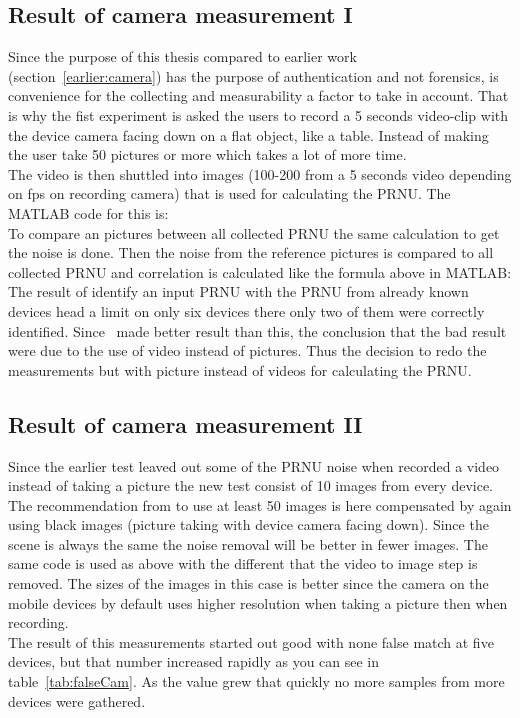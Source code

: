 \subsection{Result of camera measurement I}
Since the purpose of this thesis compared to earlier work (section~\ref{earlier:camera}) has the purpose of authentication and not forensics, is convenience for the collecting and measurability a factor to take in account. That is why the fist experiment is asked the users to record a 5 seconds video-clip with the device camera facing down on a flat object, like a table. Instead of making the user take 50 pictures or more which takes a lot of more time. \\
The video is then shuttled into images (100-200 from a 5 seconds video depending on fps on recording camera) that is used for calculating the PRNU. The MATLAB code for this is:\\


To compare an pictures between all collected PRNU the same calculation to get the noise is done. Then the noise from the reference pictures is compared to all collected PRNU and correlation is calculated like the formula above in MATLAB:\\


The result of identify an input PRNU with the PRNU from already known devices head a limit on only six devices there only two of them were correctly identified. Since~\cite{sensor:camera:DCIdent} made better result than this, the conclusion that the bad result were due to the use of video instead of pictures. Thus the decision to redo the measurements but with picture instead of videos for calculating the PRNU. 

\subsection{Result of camera measurement II}
Since the earlier test leaved out some of the PRNU noise when recorded a video instead of taking a picture the new test consist of 10 images from every device. The recommendation from \cite{sensor:camera:DCIdent} to use at least 50 images is here compensated by again using black images (picture taking with device camera facing down). Since the scene is always the same the noise removal will be better in fewer images. The same code is used as above with the different that the video to image step is removed. The sizes of the images in this case is better since the camera on the mobile devices by default uses higher resolution when taking a picture then when recording. \\
The result of this measurements started out good with none false match at five devices, but that number increased rapidly as you can see in table~\ref{tab:falseCam}. As the value grew that quickly no more samples from more devices were gathered.

